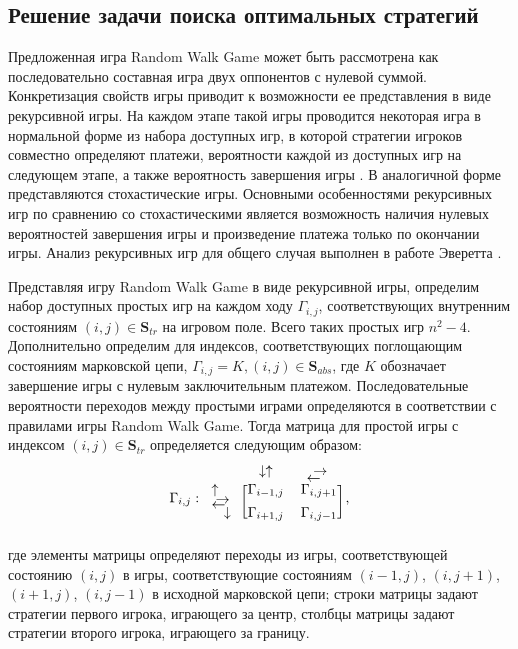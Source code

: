 \subsection{Решение задачи поиска оптимальных стратегий}\label{subsec:ch3/sec3/sub4}

Предложенная игра Random Walk Game может быть рассмотрена как последовательно составная игра двух оппонентов с нулевой суммой. Конкретизация свойств игры приводит к возможности ее представления в виде рекурсивной игры. На каждом этапе такой игры проводится некоторая игра в нормальной форме из набора доступных игр, в которой стратегии игроков совместно определяют платежи, вероятности каждой из доступных игр на следующем этапе, а также вероятность завершения игры \cite{luce_games_1957a}. В аналогичной форме представляются стохастические игры. Основными особенностями рекурсивных игр по сравнению со стохастическими является возможность наличия нулевых вероятностей завершения игры и произведение платежа только по окончании игры. Анализ рекурсивных игр для общего случая выполнен в работе Эверетта \cite{everett_recursive_1958}.

Представляя игру Random Walk Game в виде рекурсивной игры, определим набор доступных простых игр на каждом ходу $\Gamma_{i,j}$, соответствующих внутренним состояниям $(i, j) \in \textbf{S}_{tr}$ на игровом поле. Всего таких простых игр $n^2-4$. Дополнительно определим для индексов, соответствующих поглощающим состояниям марковской цепи, $\Gamma_{i,j}=K, (i,j) \in \textbf{S}_{abs}$, где $K$ обозначает завершение игры с нулевым заключительным платежом. Последовательные вероятности переходов между простыми играми определяются в соответствии с правилами игры Random Walk Game. Тогда матрица для простой игры с индексом $(i, j) \in \textbf{S}_{tr}$ определяется следующим образом:
\begin{equation}
    \begin{aligned}
        \Gamma_{i,j}: \begin{blockarray}{ccc}
     & \mathbin\downarrow\hspace{-0.3em}\uparrow & \text{\makebox[2pt][l]{\raisebox{-5pt}{$\leftarrow$}}}\rightarrow \\
    \begin{block}{l[cc]}
        \text{\makebox[3pt][l]{\raisebox{0pt}{$\uparrow$}}}\text{\makebox[0pt][l]{\raisebox{-7pt}{$\rightarrow$}}} & \Gamma_{i-1,j} & \Gamma_{i,j+1} \\
        \text{\makebox[6pt][l]{\raisebox{6pt}{$\leftarrow$}}}\downarrow & \Gamma_{i+1,j} & \Gamma_{i,j-1} \\
    \end{block}
    \end{blockarray},
    \label{eq:recursive-game-transitions}
    \end{aligned}
\end{equation}
где элементы матрицы определяют переходы из игры, соответствующей состоянию $(i, j)$ в игры, соответствующие состояниям $(i-1, j)$, $(i, j+1)$, $(i+1, j)$, $(i, j-1)$ в исходной марковской цепи; строки матрицы задают стратегии первого игрока, играющего за центр, столбцы матрицы задают стратегии второго игрока, играющего за границу. 


